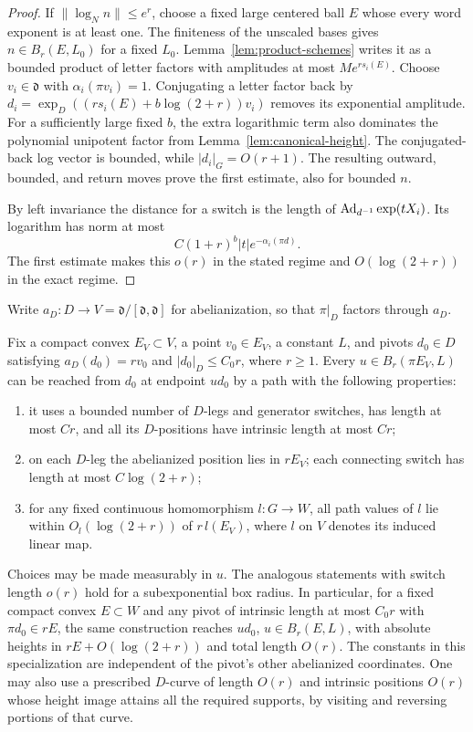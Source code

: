 \begin{proof}
If $\|\log_Nn\|\le e^r$, choose a fixed large centered ball $E$
whose every word exponent is at least one. The finiteness of the
unscaled bases gives $n\in B_r(E,L_0)$ for a fixed $L_0$.
Lemma~\ref{lem:product-schemes} writes it as a bounded product of
letter factors with amplitudes at most $Me^{rs_i(E)}$.
Choose $v_i\in\mathfrak d$ with $\alpha_i(\pi v_i)=1$.
Conjugating a letter factor back by
$d_i=\exp_D((rs_i(E)+b\log(2+r))v_i)$ removes its exponential
amplitude. For a sufficiently large fixed $b$, the extra logarithmic
term also dominates the polynomial unipotent factor from
Lemma~\ref{lem:canonical-height}. The conjugated-back log vector is
bounded, while $|d_i|_G=O(r+1)$. The resulting outward, bounded,
and return moves prove the first estimate, also for bounded $n$.

By left invariance the distance for a switch is the length of
$\operatorname{Ad}_{d^{-1}}\exp(tX_i)$. Its logarithm has norm at most
\[
 C(1+r)^b|t|e^{-\alpha_i(\pi d)}.
\]
The first estimate makes this $o(r)$ in the stated regime and
$O(\log(2+r))$ in the exact regime.
\end{proof}

Write $a_D:D\to V=\mathfrak d/[\mathfrak d,\mathfrak d]$ for
abelianization, so that $\pi|_D$ factors through $a_D$.

\begin{lemma}\label{lem:support-switch-paths}
Fix a compact convex $E_V\subset V$, a point $v_0\in E_V$, a
constant $L$, and pivots $d_0\in D$ satisfying
$a_D(d_0)=rv_0$ and $|d_0|_D\le C_0r$, where $r\ge1$.
Every $u\in B_r(\pi E_V,L)$ can be reached from $d_0$ at endpoint
$ud_0$ by a path with the following properties:
\begin{enumerate}
\item it uses a bounded number of $D$-legs and generator switches,
has length at most $Cr$, and all its $D$-positions have intrinsic
length at most $Cr$;
\item on each $D$-leg the abelianized position lies in $rE_V$;
each connecting switch has length at most $C\log(2+r)$;
\item for any fixed continuous homomorphism $l:G\to W$, all
path values of $l$ lie within $O_l(\log(2+r))$ of $r\,l(E_V)$,
where $l$ on $V$ denotes its induced linear map.
\end{enumerate}
Choices may be made measurably in $u$. The analogous statements
with switch length $o(r)$ hold for a subexponential box radius.
In particular, for a fixed compact convex $E\subset W$ and any
pivot of intrinsic length at most $C_0r$ with $\pi d_0\in rE$,
the same construction reaches $ud_0$, $u\in B_r(E,L)$, with
absolute heights in $rE+O(\log(2+r))$ and total length $O(r)$.
The constants in this specialization are independent of the
pivot's other abelianized coordinates.
One may also use a prescribed $D$-curve of length $O(r)$ and
intrinsic positions $O(r)$ whose height image attains all the
required supports, by visiting and reversing portions of that curve.
\end{lemma}

